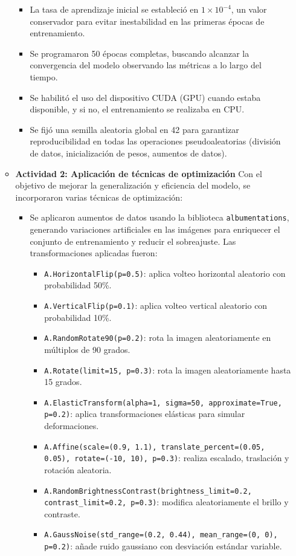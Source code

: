 \begin{enumerate}
\begin{itemize}
\begin{itemize}
\item La tasa de aprendizaje inicial se estableció en $1 \times 10^{-4}$, un valor conservador para evitar inestabilidad en las primeras épocas de entrenamiento.
\item Se programaron 50 épocas completas, buscando alcanzar la convergencia del modelo observando las métricas a lo largo del tiempo.
\item Se habilitó el uso del dispositivo CUDA (GPU) cuando estaba disponible, y si no, el entrenamiento se realizaba en CPU.
\item Se fijó una semilla aleatoria global en 42 para garantizar reproducibilidad en todas las operaciones pseudoaleatorias (división de datos, inicialización de pesos, aumentos de datos).
\end{itemize}

  \item\textbf{Actividad 2: Aplicación de técnicas de optimización}
  Con el objetivo de mejorar la generalización y eficiencia del modelo, se incorporaron varias técnicas de optimización:
\begin{itemize}
\item Se aplicaron aumentos de datos usando la biblioteca \texttt{albumentations}, generando variaciones artificiales en las imágenes para enriquecer el conjunto de entrenamiento y reducir el sobreajuste. Las transformaciones aplicadas fueron:
  \begin{itemize}
  \item \texttt{A.HorizontalFlip(p=0.5)}: aplica volteo horizontal aleatorio con probabilidad 50\%.
  \item \texttt{A.VerticalFlip(p=0.1)}: aplica volteo vertical aleatorio con probabilidad 10\%.
  \item \texttt{A.RandomRotate90(p=0.2)}: rota la imagen aleatoriamente en múltiplos de 90 grados.
  \item \texttt{A.Rotate(limit=15, p=0.3)}: rota la imagen aleatoriamente hasta 15 grados.
  \item \texttt{A.ElasticTransform(alpha=1, sigma=50, approximate=True, p=0.2)}: aplica transformaciones elásticas para simular deformaciones.
  \item \texttt{A.Affine(scale=(0.9, 1.1), translate\_percent=(0.05, 0.05), rotate=(-10, 10), p=0.3)}: realiza escalado, traslación y rotación aleatoria.
  \item \texttt{A.RandomBrightnessContrast(brightness\_limit=0.2, contrast\_limit=0.2, p=0.3)}: modifica aleatoriamente el brillo y contraste.
  \item \texttt{A.GaussNoise(std\_range=(0.2, 0.44), mean\_range=(0, 0), p=0.2)}: añade ruido gaussiano con desviación estándar variable.

\end{itemize}
\end{itemize}
\end{itemize}
\end{enumerate}
